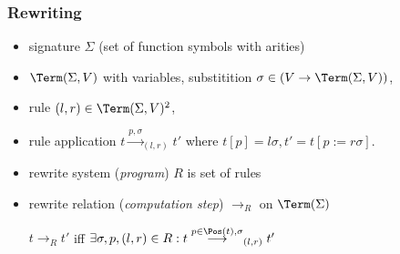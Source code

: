 \begin{frame}[fragile]
\frametitle{Rewriting}

  \begin{itemize} %
  \item signature $\Sigma$ (set of function symbols with arities)
  \item $\Term(\Sigma,V)$ with variables, 
    substitition $\sigma \in (V\to\Term(\Sigma,V))$,
  \item rule $(l,r)\in\Term(\Sigma,V)^2$,
  \item rule application 
    $t\stackrel{p,\sigma}{\longrightarrow}_{(l,r)} t'$ 
    where $t[p]=l\sigma, t'=t[p:=r\sigma]$.
  \item rewrite system (\emph{program}) $R$ is set of rules
  \item rewrite relation (\emph{computation step}) $\to_R$
    on $\Term(\Sigma)$

    $t\to_R t'$ iff $\exists \sigma,p,(l,r)\in R: 
    t\stackrel{p\in\Pos(t),\sigma}{\longrightarrow}_{(l,r)} t'$
  \end{itemize}

\end{frame}

